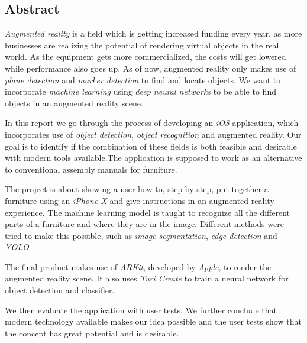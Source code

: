 \begin{center}
\section*{Abstract}
\end{center}
\textit{Augmented reality} is a field which is getting increased funding every year, as more businesses are realizing the potential of rendering virtual objects in the real world. As the equipment gets more commercialized, the costs will get lowered while performance also goes up. As of now, augmented reality only makes use of \textit{plane detection} and \textit{marker detection} to find and locate objects. We want to incorporate \textit{machine learning} using \textit{deep neural networks} to be able to find objects in an augmented reality scene. 

In this report we go through the process of developing an \textit{iOS} application, which incorporates use of \textit{object detection}, \textit{object recognition} and augmented reality. Our goal is to identify if the combination of these fields is both feasible and desirable with modern tools available.The application is supposed to work as an alternative to conventional assembly manuals for furniture. 

The project is about showing a user how to, step by step, put together a furniture using an \textit{iPhone X} and give instructions in an augmented reality experience.
The machine learning model is taught to recognize all the different parts of a furniture and where they are in the image. Different methods were tried to make this possible, such as \textit{image segmentation}, \textit{edge detection} and \textit{YOLO}.

The final product makes use of \textit{ARKit}, developed by \textit{Apple}, to render the augmented reality scene. It also uses \textit{Turi Create} to train a neural network for object detection and classifier. 

We then evaluate the application with user tests. We further conclude that modern technology available makes our idea possible and the user tests show that the concept has great potential and is desirable.
\newpage